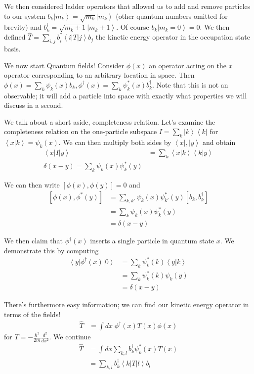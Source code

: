 \documentclass[10pt]{report}
\newcommand{\bra}[1]{\left<#1\right|}
\newcommand{\ket}[1]{\left|#1\right>}
\newcommand{\dotp}[2]{\left<#1\left.\right|#2\right>}
\newcommand{\rtd}[2]{\frac{d^2#1}{d#2^2}}
\begin{document}
We then considered ladder operators that allowed us to add and remove particles to our system $b_k \ket{m_k} = \sqrt{m_k}\ket{m_{k}}$ (other quantum numbers omitted for brevity) and $b_k^\dagger = \sqrt{m_k + 1}\ket{m_k + 1}$. Of course $b_k\ket{m_k = 0} = 0$. We then defined $\hat{T} = \sum_{i,j}^{}b_i^\dagger \bra{i}T\ket{j}b_j$ the kinetic energy operator in the occupation state basis.

We now start Quantum fields! Consider $\phi(x)$ an operator acting on the $x$ operator corresponding to an arbitrary location in space. Then $\phi(x) = \sum_{k}^{}\psi_k(x)b_k, \phi^\dagger(x) = \sum_{k}^{}\psi_k^*(x)b_k^\dagger$. Note that this is not an observable; it will add a particle into space with exactly what properties we will discuss in a second.

We talk about a short aside, completeness relation. Let's examine the completeness relation on the one-particle subspace $I = \sum_{k}^{}\ket{k}\bra{k}$ for $\dotp{x}{k} = \psi_k(x)$. We can then multiply both sides by $\bra{x}, \ket{y}$ and obtain
\begin{align}
    \bra{x}I\ket{y} &= \sum_{k}^{}\dotp{x}{k}\dotp{k}{y}\\
    \delta(x-y) = \sum_{k}^{}\psi_k(x)\psi_k^*(y)
\end{align}

We can then write $\left[ \phi(x), \phi(y) \right] = 0$ and 
\begin{align}
    \left[ \phi(x), \phi^*(y) \right] &= \sum_{k,k'}^{}\psi_k(x) \psi_{k'}^*(y)\left[ b_k, b_k^\dagger \right]\\
    &= \sum_{k}^{}\psi_k(x) \psi_k^*(y)\\
    &= \delta(x-y)
\end{align}

We then claim that $\phi^\dagger(x)$ inserts a single particle in quantum state $x$. We demonstrate this by computing
\begin{align}
    \bra{y}\phi^\dagger(x)\ket{0} &= \sum_{k}^{}\psi_k^*(k)\dotp{y}{k}\\
    &= \sum_{k}^{}\psi_k^*(k)\psi_k(y)\\
    &= \delta(x-y)
\end{align}

There's furthermore easy information; we can find our kinetic energy operator in terms of the fields!
\begin{align}
    \hat{T} &= \int dx\; \phi^\dagger(x)T(x)\phi(x)
\end{align}
for $T = -\frac{\hbar^2}{2m}\rtd{}{x}$. We continue
\begin{align}
    \hat{T} &= \int dx \sum_{k,l}^{}b_k^\dagger\psi_k^*(x)T(x)\\
    &=\sum_{k,l}^{}b_k^\dagger\bra{k}T\ket{l}b_l
\end{align}
\end{document}
